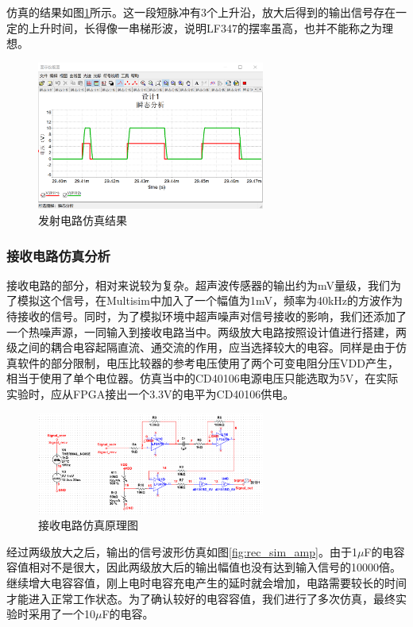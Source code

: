 \documentclass[a4paper, twocolumn]{ctexart}
\begin{document}
仿真的结果如图\ref{fig:tran_sim_result}所示。这一段短脉冲有3个上升沿，放大后得到的输出信号存在一定的上升时间，长得像一串梯形波，说明LF347的摆率虽高，也并不能称之为理想。

\begin{figure}[ht]
    \centering
    \includegraphics[width=7.5cm]{../assets/发射电路仿真结果.png}
    \caption{发射电路仿真结果}
    \label{fig:tran_sim_result}
\end{figure}

\subsubsection{接收电路仿真分析}

接收电路的部分，相对来说较为复杂。超声波传感器的输出约为mV量级，我们为了模拟这个信号，在Multisim中加入了一个幅值为1mV，频率为40kHz的方波作为待接收的信号。同时，为了模拟环境中超声噪声对信号接收的影响，我们还添加了一个热噪声源，一同输入到接收电路当中。两级放大电路按照设计值进行搭建，两级之间的耦合电容起隔直流、通交流的作用，应当选择较大的电容。同样是由于仿真软件的部分限制，电压比较器的参考电压使用了两个可变电阻分压VDD产生，相当于使用了单个电位器。仿真当中的CD40106电源电压只能选取为5V，在实际实验时，应从FPGA接出一个3.3V的电平为CD40106供电。

\begin{figure}[ht]
    \centering
    \includegraphics[width=7.5cm]{../assets/接收电路仿真原理图.png}
    \caption{接收电路仿真原理图}
    \label{fig:rec_sim_sch}
\end{figure}

经过两级放大之后，输出的信号波形仿真如图\ref{fig:rec_sim_amp}。由于1$\mu$F的电容容值相对不是很大，因此两级放大后的输出幅值也没有达到输入信号的10000倍。继续增大电容容值，刚上电时电容充电产生的延时就会增加，电路需要较长的时间才能进入正常工作状态。为了确认较好的电容容值，我们进行了多次仿真，最终实验时采用了一个10$\mu$F的电容。
\end{document}
